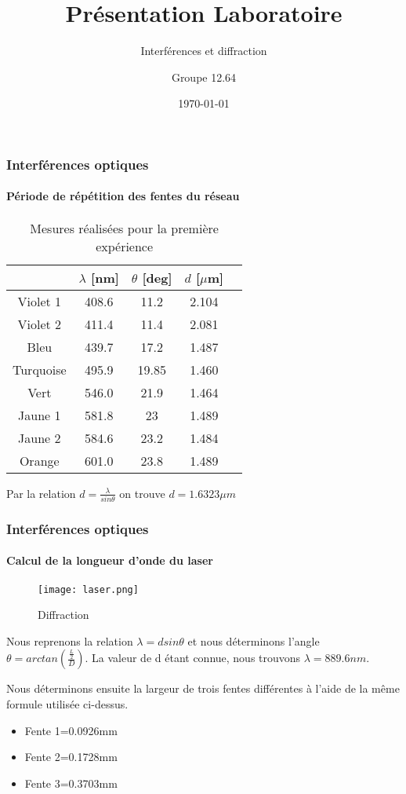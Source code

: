\documentclass{beamer}
\begin{document}
\title[Présentation]{Présentation Laboratoire}

\subtitle[\ldots]{Interférences et diffraction}
\author{Groupe 12.64}
\date{\today}
\maketitle

\begin{frame}
\frametitle{Interférences optiques}
\framesubtitle{Période de répétition des fentes du réseau}

\begin{table}[!h]
	\begin{center}
	\begin{tabular}{|c|c|c|c|c|}
	\hline
		& $\lambda$ [nm] & $\theta$ [deg] & $d$ [$\mu $m] \\
	\hline
		Violet 1 & 408.6 & 11.2 & 2.104\\
		Violet 2 & 411.4 & 11.4 & 2.081\\
		Bleu & 439.7 & 17.2 & 1.487\\
		Turquoise & 495.9 & 19.85 & 1.460\\
		Vert & 546.0 & 21.9 & 1.464 \\
		Jaune 1 & 581.8 & 23 & 1.489 \\
		Jaune 2 & 584.6 & 23.2 & 1.484\\
		Orange & 601.0 & 23.8 & 1.489\\
		
	\hline
	
	\end{tabular}
	\caption{Mesures réalisées pour la première expérience}
	\end{center}
	\end{table}
	
	Par la relation $ d=\frac{\lambda}{sin\theta}$ on trouve $d=1.6323\mu m$
\end{frame} 

\begin{frame}
\frametitle{Interférences optiques}
\framesubtitle{Calcul de la longueur d'onde du laser}
\begin{minipage}[t]{0.46\textwidth}
	\begin{figure}
		\texttt{[image: laser.png]}
		\caption{Diffraction}
	\end{figure}
\end{minipage}
\begin{minipage}[t]{0.46\textwidth}
	Nous reprenons la relation $\lambda=dsin\theta$ et nous déterminons l'angle $\theta=arctan(\frac{\frac{L}{2}}{D})$. La valeur de d étant connue, nous trouvons $\lambda=889.6nm$.
\end{minipage}

Nous déterminons ensuite la largeur de trois fentes différentes à l'aide de la même formule utilisée ci-dessus.
\begin{itemize}
\item Fente 1=0.0926mm
\item Fente 2=0.1728mm
\item Fente 3=0.3703mm
\end{itemize} 


\end{frame}
\end{document}

